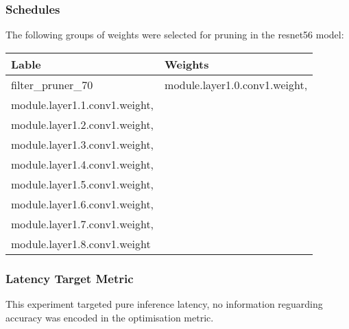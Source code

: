 \documentclass[../Dissertation.tex]{subfiles}
\begin{document}
\subsubsection{Schedules}
The following groups of weights were selected for pruning in the resnet56 model:

\begin{table}[H]
    \begin{tabular}{@{}|l|l|@{}}
        \toprule
        Lable & Weights \\
        \midrule
        filter\_pruner\_70 & module.layer1.0.conv1.weight,\\
        module.layer1.1.conv1.weight,\\
        module.layer1.2.conv1.weight,\\
        module.layer1.3.conv1.weight,\\
        module.layer1.4.conv1.weight,\\
        module.layer1.5.conv1.weight,\\
        module.layer1.6.conv1.weight,\\
        module.layer1.7.conv1.weight,\\
        module.layer1.8.conv1.weight
    \end{tabular}
\end{table}

\subsubsection{Latency Target Metric}
This experiment targeted pure inference latency, no information reguarding accuracy was encoded in the optimisation metric. 
\end{document}
